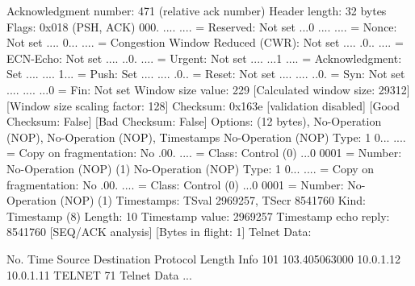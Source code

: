     Acknowledgment number: 471    (relative ack number)
    Header length: 32 bytes
    Flags: 0x018 (PSH, ACK)
        000. .... .... = Reserved: Not set
        ...0 .... .... = Nonce: Not set
        .... 0... .... = Congestion Window Reduced (CWR): Not set
        .... .0.. .... = ECN-Echo: Not set
        .... ..0. .... = Urgent: Not set
        .... ...1 .... = Acknowledgment: Set
        .... .... 1... = Push: Set
        .... .... .0.. = Reset: Not set
        .... .... ..0. = Syn: Not set
        .... .... ...0 = Fin: Not set
    Window size value: 229
    [Calculated window size: 29312]
    [Window size scaling factor: 128]
    Checksum: 0x163e [validation disabled]
        [Good Checksum: False]
        [Bad Checksum: False]
    Options: (12 bytes), No-Operation (NOP), No-Operation (NOP), Timestamps
        No-Operation (NOP)
            Type: 1
                0... .... = Copy on fragmentation: No
                .00. .... = Class: Control (0)
                ...0 0001 = Number: No-Operation (NOP) (1)
        No-Operation (NOP)
            Type: 1
                0... .... = Copy on fragmentation: No
                .00. .... = Class: Control (0)
                ...0 0001 = Number: No-Operation (NOP) (1)
        Timestamps: TSval 2969257, TSecr 8541760
            Kind: Timestamp (8)
            Length: 10
            Timestamp value: 2969257
            Timestamp echo reply: 8541760
    [SEQ/ACK analysis]
        [Bytes in flight: 1]
Telnet
    Data: 

No.     Time           Source                Destination           Protocol Length Info
    101 103.405063000  10.0.1.12             10.0.1.11             TELNET   71     Telnet Data ...

